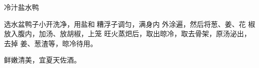 \begin{recipe}{冷汁盐水鸭}

\ingredients


\preparation

\step 选水盆鸭子小开洗净，用盐和𰪿糟浮子调匀，满身内 外涂遍，然后将葱、姜、花
椒放入腹内，加汤、放胡椒，上笼 旺火蒸𤆵后，取出晾冷，取去骨架，原汤泌出，去掉
姜、葱渣等，晾冷待用。

\features

鲜嫩清美，宜夏天佐酒。

\end{recipe}

